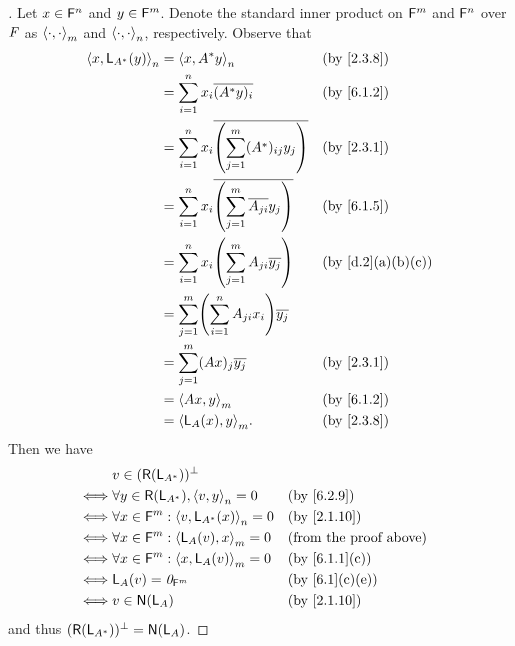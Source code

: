 \begin{proof}[]
  Let \(x \in \mathsf{F}^n\) and \(y \in \mathsf{F}^m\).
  Denote the standard inner product on \(\mathsf{F}^m\) and \(\mathsf{F}^n\) over \(\mathit{F}\) as \(\left\langle\cdot, \cdot\right\rangle_m\) and \(\left\langle\cdot, \cdot\right\rangle_n\), respectively.
  Observe that
  \begin{align*}
    \inn{x, \L_{A^*}(y)}_n & = \inn{x, A^* y}_n                                                 &  & \by{2.3.8}      \\
                           & = \sum_{i = 1}^n x_i \conj{(A^* y)_i}                              &  & \by{6.1.2}      \\
                           & = \sum_{i = 1}^n x_i \conj{\pa{\sum_{j = 1}^m (A^*)_{i j} y_j}}    &  & \by{2.3.1}      \\
                           & = \sum_{i = 1}^n x_i \conj{\pa{\sum_{j = 1}^m \conj{A_{j i}} y_j}} &  & \by{6.1.5}      \\
                           & = \sum_{i = 1}^n x_i \pa{\sum_{j = 1}^m A_{j i} \conj{y_j}}        &  & \by{d.2}[a,b,c] \\
                           & = \sum_{j = 1}^m \pa{\sum_{i = 1}^n A_{j i} x_i} \conj{y_j}                             \\
                           & = \sum_{j = 1}^m (Ax)_j \conj{y_j}                                 &  & \by{2.3.1}      \\
                           & = \inn{Ax, y}_m                                                    &  & \by{6.1.2}      \\
                           & = \inn{\L_A(x), y}_m.                                              &  & \by{2.3.8}
  \end{align*}
  Then we have
  \begin{align*}
         & v \in (\rg{\L_{A^*}})^{\perp}                                                          \\
    \iff & \forall y \in \rg{\L_{A^*}}, \inn{v, y}_n = 0       &  & \by{6.2.9}                    \\
    \iff & \forall x \in \vs{F}^m : \inn{v, \L_{A^*}(x)}_n = 0 &  & \by{2.1.10}                   \\
    \iff & \forall x \in \vs{F}^m : \inn{\L_A(v), x}_m = 0     &  & \text{(from the proof above)} \\
    \iff & \forall x \in \vs{F}^m : \inn{x, \L_A(v)}_m = 0     &  & \by{6.1.1}[c]                 \\
    \iff & \L_A(v) = \zv_{\vs{F}^m}                            &  & \by{6.1}[c,e]                 \\
    \iff & v \in \ns{\L_A}                                     &  & \by{2.1.10}
  \end{align*}
  and thus \((\rg{\L_{A^*}})^{\perp} = \ns{\L_A}\).
\end{proof}

